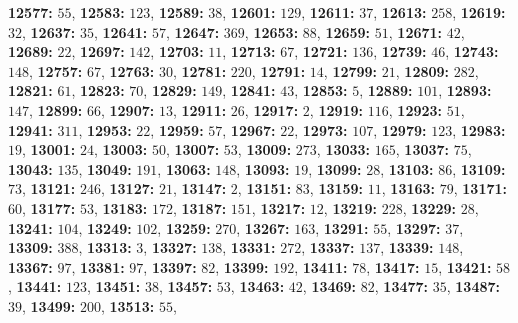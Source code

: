 \textsf{\bfseries 12577:} $55$, \textsf{\bfseries 12583:} $123$, \textsf{\bfseries 12589:} $38$, \textsf{\bfseries 12601:} $129$, \textsf{\bfseries 12611:} $37$, \textsf{\bfseries 12613:} $258$, \textsf{\bfseries 12619:} $32$, \textsf{\bfseries 12637:} $35$, \textsf{\bfseries 12641:} $57$, \textsf{\bfseries 12647:} $369$, \textsf{\bfseries 12653:} $88$, \textsf{\bfseries 12659:} $51$, \textsf{\bfseries 12671:} $42$, \textsf{\bfseries 12689:} $22$, \textsf{\bfseries 12697:} $142$, \textsf{\bfseries 12703:} $11$, \textsf{\bfseries 12713:} $67$, \textsf{\bfseries 12721:} $136$, \textsf{\bfseries 12739:} $46$, \textsf{\bfseries 12743:} $148$, \textsf{\bfseries 12757:} $67$, \textsf{\bfseries 12763:} $30$, \textsf{\bfseries 12781:} $220$, \textsf{\bfseries 12791:} $14$, \textsf{\bfseries 12799:} $21$, \textsf{\bfseries 12809:} $282$, \textsf{\bfseries 12821:} $61$, \textsf{\bfseries 12823:} $70$, \textsf{\bfseries 12829:} $149$, \textsf{\bfseries 12841:} $43$, \textsf{\bfseries 12853:} $5$, \textsf{\bfseries 12889:} $101$, \textsf{\bfseries 12893:} $147$, \textsf{\bfseries 12899:} $66$, \textsf{\bfseries 12907:} $13$, \textsf{\bfseries 12911:} $26$, \textsf{\bfseries 12917:} $2$, \textsf{\bfseries 12919:} $116$, \textsf{\bfseries 12923:} $51$, \textsf{\bfseries 12941:} $311$, \textsf{\bfseries 12953:} $22$, \textsf{\bfseries 12959:} $57$, \textsf{\bfseries 12967:} $22$, \textsf{\bfseries 12973:} $107$, \textsf{\bfseries 12979:} $123$, \textsf{\bfseries 12983:} $19$, \textsf{\bfseries 13001:} $24$, \textsf{\bfseries 13003:} $50$, \textsf{\bfseries 13007:} $53$, \textsf{\bfseries 13009:} $273$, \textsf{\bfseries 13033:} $165$, \textsf{\bfseries 13037:} $75$, \textsf{\bfseries 13043:} $135$, \textsf{\bfseries 13049:} $191$, \textsf{\bfseries 13063:} $148$, \textsf{\bfseries 13093:} $19$, \textsf{\bfseries 13099:} $28$, \textsf{\bfseries 13103:} $86$, \textsf{\bfseries 13109:} $73$, \textsf{\bfseries 13121:} $246$, \textsf{\bfseries 13127:} $21$, \textsf{\bfseries 13147:} $2$, \textsf{\bfseries 13151:} $83$, \textsf{\bfseries 13159:} $11$, \textsf{\bfseries 13163:} $79$, \textsf{\bfseries 13171:} $60$, \textsf{\bfseries 13177:} $53$, \textsf{\bfseries 13183:} $172$, \textsf{\bfseries 13187:} $151$, \textsf{\bfseries 13217:} $12$, \textsf{\bfseries 13219:} $228$, \textsf{\bfseries 13229:} $28$, \textsf{\bfseries 13241:} $104$, \textsf{\bfseries 13249:} $102$, \textsf{\bfseries 13259:} $270$, \textsf{\bfseries 13267:} $163$, \textsf{\bfseries 13291:} $55$, \textsf{\bfseries 13297:} $37$, \textsf{\bfseries 13309:} $388$, \textsf{\bfseries 13313:} $3$, \textsf{\bfseries 13327:} $138$, \textsf{\bfseries 13331:} $272$, \textsf{\bfseries 13337:} $137$, \textsf{\bfseries 13339:} $148$, \textsf{\bfseries 13367:} $97$, \textsf{\bfseries 13381:} $97$, \textsf{\bfseries 13397:} $82$, \textsf{\bfseries 13399:} $192$, \textsf{\bfseries 13411:} $78$, \textsf{\bfseries 13417:} $15$, \textsf{\bfseries 13421:} $58$, \textsf{\bfseries 13441:} $123$, \textsf{\bfseries 13451:} $38$, \textsf{\bfseries 13457:} $53$, \textsf{\bfseries 13463:} $42$, \textsf{\bfseries 13469:} $82$, \textsf{\bfseries 13477:} $35$, \textsf{\bfseries 13487:} $39$, \textsf{\bfseries 13499:} $200$, \textsf{\bfseries 13513:} $55$, 
